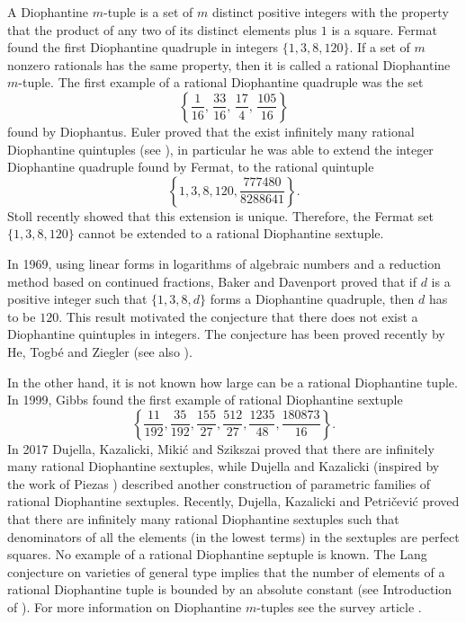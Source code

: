 \documentclass[a4paper]{amsart}
\theoremstyle{plain}
\theoremstyle{definition}
\begin{document}
A Diophantine $m$-tuple is a set of $m$ distinct positive
integers with the property that the product of any two of its distinct
elements plus $1$ is a square. Fermat found the first Diophantine quadruple in integers $\{1,3,8,120\}$.
If a set of $m$ nonzero rationals
has the same property, then it is called
a rational Diophantine $m$-tuple.
The first example of a rational Diophantine quadruple was the set
$$
\left\{\frac{1}{16},\, \frac{33}{16},\, \frac{17}{4},\, \frac{105}{16}\right\}
$$
found by Diophantus. Euler proved that the exist
infinitely many rational Diophantine quintuples (see \cite{Hea}),
in particular he was able to extend the integer Diophantine quadruple found by Fermat,
to the rational quintuple
$$
\left\{ 1, 3, 8, 120, \frac{777480}{8288641} \right\}.
$$
Stoll \cite{Stoll} recently showed that this extension is unique.
Therefore, the Fermat set $\{1,3,8,120\}$ cannot be extended to a rational Diophantine sextuple.

In 1969, using linear forms in logarithms of algebraic numbers and a reduction method
based on continued fractions, Baker and Davenport \cite{B-D}
proved that if $d$ is a positive integer such that
$\{1, 3, 8, d\}$ forms a Diophantine quadruple, then $d$ has to be $120$.
This result motivated the conjecture that there does not exist a Diophantine quintuples in integers.
The conjecture has been proved recently by He, Togb\'e and Ziegler \cite{HTZ}
(see also \cite{BTF,duje-crelle}).

In the other hand, it is not known how large can be a rational Diophantine tuple.
In 1999, Gibbs found the first example of rational Diophantine sextuple \cite{Gibbs1}
$$
\left\{ \frac{11}{192}, \frac{35}{192}, \frac{155}{27}, \frac{512}{27}, \frac{1235}{48}, \frac{180873}{16} \right\}.
$$
In 2017 Dujella, Kazalicki, Miki\'c and Szikszai \cite{DKMS} proved that there are
infinitely many rational Diophantine sextuples, while
Dujella and Kazalicki \cite{Duje-Matija} (inspired by the work of Piezas \cite{P})
described another construction of parametric families of rational Diophantine sextuples.
Recently, Dujella, Kazalicki and Petri\v{c}evi\'c \cite{DKP-sext}
proved that there are infinitely many rational Diophantine sextuples
such that denominators of all the elements (in the lowest terms) in the sextuples are perfect squares.
No example of a rational Diophantine septuple is known.
The Lang conjecture on varieties of general type implies that
the number of elements of a rational Diophantine tuple is bounded by an absolute constant
(see Introduction of \cite{DKMS}).
For more information on Diophantine $m$-tuples see the survey article \cite{Duje-notices}.
\end{document}
